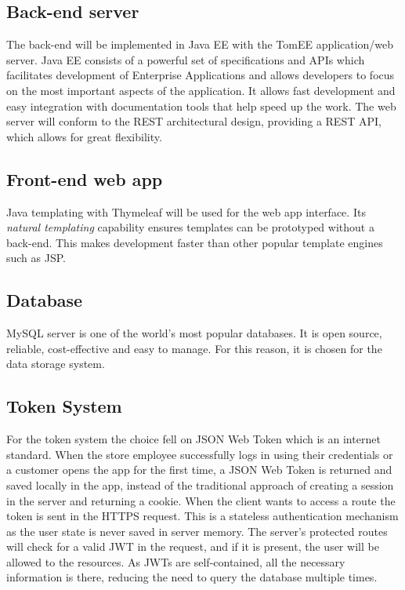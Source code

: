 \subsection{Back-end server}
The back-end will be implemented in Java EE with the TomEE application/web server. Java EE consists of a powerful set of specifications and
APIs which facilitates development of Enterprise Applications and allows developers to focus on the most important aspects of the application.
It allows fast development and easy integration with documentation tools that help speed up the work.\newline
The web server will conform to the REST architectural design, providing a REST API, which allows for great flexibility.
 
\subsection{Front-end web app}
Java templating with Thymeleaf will be used for the web app interface. Its \textit{natural templating} capability ensures templates can be prototyped without a back-end. This makes development faster than other popular template engines such as JSP.

\subsection{Database}
MySQL server is one of the world’s most popular databases. It is open source, reliable, cost-effective and easy to manage. For this reason, it is chosen for the data storage system.

\subsection{Token System}
For the token system the choice fell on JSON Web Token which is an internet standard.\newline
When the store employee successfully logs in using their credentials or a customer opens the app for the first time, a JSON Web Token is returned and saved locally in the app, instead of the traditional approach of creating a session in the server and returning a cookie.\newline
When the client wants to access a route the token is sent in the HTTPS request. This is a stateless authentication mechanism as the user state is never saved in server memory. The server's protected routes will check for a valid JWT in the request, and if it is present, the user will be allowed to the resources.\newline
As JWTs are self-contained, all the necessary information is there, reducing the need to query the database multiple times.

